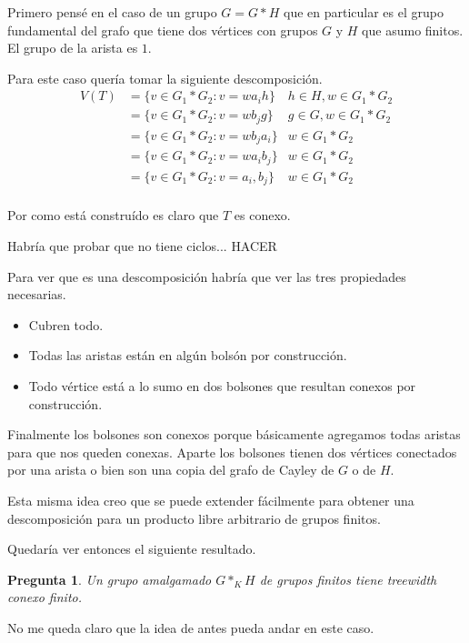 \documentclass[12pt]{article}
\theoremstyle{plain} %
\newtheorem{preg}[teo]{\color{rojo} Pregunta}
\theoremstyle{definition}
\theoremstyle{remark}
\newcommand{\red}{\textcolor{rojo}}
\begin{document}
Primero pensé en el caso de un grupo $G = G \ast H$ que en particular es el grupo fundamental del grafo que tiene dos vértices con grupos $G$ y $H$ que asumo finitos. El grupo de la arista es $1$.

Para este caso quería tomar la siguiente descomposición.
\begin{align*}
V(T) &= \{ v \in G_1 \ast G_2 : v = wa_ih  \} & h \in H, w \in G_1 \ast G_2 \\
 & = \{ v \in G_1 \ast G_2 : v = wb_jg  \} &  g \in G, w \in G_1 \ast G_2 \\
 & = \{ v \in G_1 \ast G_2 : v = wb_ja_i  \} & w \in G_1 \ast G_2 \\
 & = \{ v \in G_1 \ast G_2 : v = wa_ib_j  \} & w \in G_1 \ast G_2 \\
 & = \{ v \in G_1 \ast G_2 : v = a_i, b_j  \} & w \in G_1 \ast G_2 \\
\end{align*}
	
Por como está construído es claro que $T$ es conexo.

Habría que probar que no tiene ciclos... 
\red{HACER}

Para ver que es una descomposición habría que ver las tres propiedades necesarias.

\begin{itemize}
	\item Cubren todo.
	\item Todas las aristas están en algún bolsón por construcción.
	\item Todo vértice está a lo sumo en dos bolsones que resultan conexos por construcción.
\end{itemize}	
	
Finalmente los bolsones son conexos porque básicamente agregamos todas aristas para que nos queden conexas. 
Aparte los bolsones tienen dos vértices conectados por una arista o bien son una copia del grafo de Cayley de $G$ o de $H$.
	
	
Esta misma idea creo que se puede extender fácilmente para obtener una descomposición para un producto libre arbitrario de grupos finitos.	
	
	
Quedaría ver entonces el siguiente resultado.

\begin{preg}
	Un grupo amalgamado $G \ast_{K} H$	de grupos finitos tiene treewidth conexo finito.
\end{preg}	
	
No me queda claro que la idea de antes pueda andar en este caso. 

	
	
	
	
	
	
	
	
	
	
	
	
	
	
	
	
	
	

	
\end{document}
